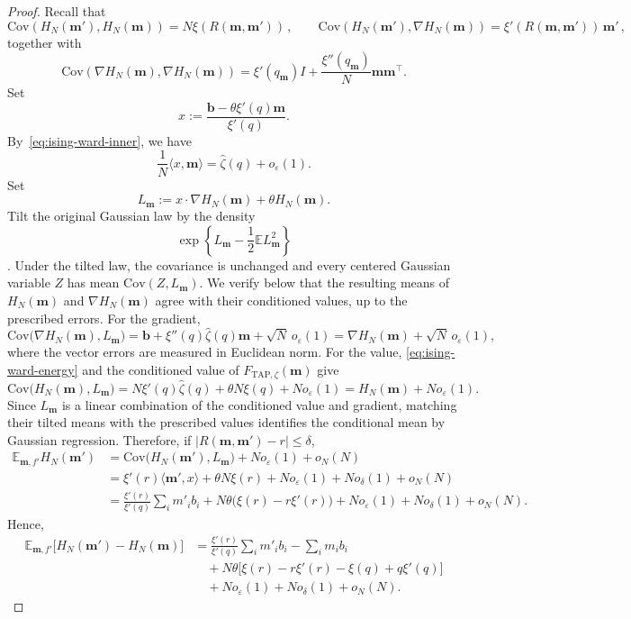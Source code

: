 \documentclass[a4paper,10pt,reqno]{amsart}
\numberwithin{equation}{section}
\newcommand{\ve}{\varepsilon}
\newcommand{\dE}{\mathbb{E}}%
\newcommand{\Cov}{\mathrm{Cov} }%
\newcommand{\TAP}{\mathrm{TAP}}
\newcommand{\bfm}{\mathbf{m}}
\newcommand{\bfb}{\mathbf{b}}
\begin{document}
\begin{proof}
		Recall that
		\[
		\Cov(H_N(\bfm'),H_N(\bfm))=N\xi(R(\bfm,\bfm'))\,,\qquad
		\Cov(H_N(\bfm'),\nabla H_N(\bfm))=\xi'(R(\bfm,\bfm'))\,\bfm'\,,
		\]
		together with
		\[
		\Cov(\nabla H_N(\bfm),\nabla H_N(\bfm))
		=
		\xi'(q_\bfm)I+\frac{\xi''(q_\bfm)}N\bfm\bfm^\top.
		\]
		Set
		\[
		x:=\frac{\bfb-\theta\xi'(q)\bfm}{\xi'(q)}.
		\]
		By~\eqref{eq:ising-ward-inner}, we have
		\[
		\frac1N\langle x,\bfm\rangle
		=\widehat\zeta(q)+o_\ve(1).
		\]
		Set
		\[
		L_\bfm:=x\cdot\nabla H_N(\bfm)+\theta H_N(\bfm).
		\]
		Tilt the original Gaussian law by the density
		\[
		\exp\left\{L_\bfm-\frac12\dE L_\bfm^2\right\}
		\].
		Under the tilted law, the covariance is unchanged and every centered
		Gaussian variable \(Z\) has mean
		\(\Cov(Z,L_\bfm)\). We verify below that the resulting means of
		\(H_N(\bfm)\) and \(\nabla H_N(\bfm)\) agree with their conditioned values,
		up to the prescribed errors. For the gradient,
		\[
		\Cov\bigl(
		\nabla H_N(\bfm),
		L_\bfm
		\bigr)
		=
		\bfb+\xi''(q)\widehat\zeta(q)\bfm
		+\sqrt N\,o_\ve(1)
		=
		\nabla H_N(\bfm)+\sqrt N\,o_\ve(1),
		\]
		where the vector errors are measured in Euclidean norm. For the value,
		\eqref{eq:ising-ward-energy} and the conditioned value of
		\(F_{\TAP,\zeta}(\bfm)\) give
		\[
		\Cov\bigl(
		H_N(\bfm),
		L_\bfm
		\bigr)
		=
		N\xi'(q)\widehat\zeta(q)+\theta N\xi(q)
		+N o_\ve(1)
		=
		H_N(\bfm)+N o_\ve(1).
		\]
		Since \(L_\bfm\) is a linear combination of the conditioned value and
		gradient, matching their tilted means with the prescribed values identifies
		the conditional mean by Gaussian regression.
		Therefore, if
		\(\lvert R(\bfm,\bfm')-r\rvert\le\delta\),
		\[
		\begin{aligned}
			\dE_{\bfm,f'} H_N(\bfm')
			&=\Cov\bigl(H_N(\bfm'),L_\bfm\bigr)
			+N o_\ve(1)+o_N(N)\\
			&=\xi'(r)\langle\bfm',x\rangle+\theta N\xi(r)
			+N o_\ve(1)+N o_\delta(1)+o_N(N)\\
			&=\frac{\xi'(r)}{\xi'(q)}\sum_i m'_i b_i
			+N\theta\bigl(\xi(r)-r\xi'(r)\bigr)
			+N o_\ve(1)+N o_\delta(1)+o_N(N).
		\end{aligned}
		\]
		Hence,
		\[
		\begin{aligned}
			\dE_{\bfm,f'}\bigl[H_N(\bfm')-H_N(\bfm)\bigr]
			&=
			\frac{\xi'(r)}{\xi'(q)}\sum_i m'_i b_i-\sum_i m_i b_i\\
			&\quad+N\theta\bigl[\xi(r)-r\xi'(r)-\xi(q)+q\xi'(q)\bigr]\\
			&\quad+N o_\ve(1)+N o_\delta(1)+o_N(N).
		\end{aligned}
		\]
		

\end{proof}
\end{document}
